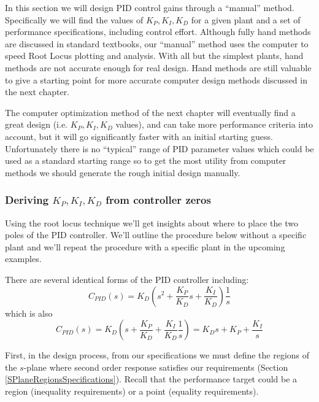 In this section we will design PID control gains through a ``manual'' method.  Specifically we will find the values of $K_P, K_I, K_D$ for a given plant and a set of performance specifications, including control effort.  Although fully hand methods are discussed in standard textbooks, our ``manual'' method uses the computer to speed Root Locus plotting and analysis.   With all but the simplest plants, hand methods are not accurate enough for real design.  Hand methods are still valuable to give a starting point for more accurate computer design methods discussed in the next chapter.

The computer optimization method of the next chapter will eventually find a great design (i.e. $K_P,K_I,K_D$ values), and can take more performance criteria into account, but it will go significantly faster with an initial starting guess.   Unfortunately there is no ``typical'' range of PID parameter values which could be used as a standard starting range so to get the most utility from computer methods we should generate the rough initial design manually.


\subsubsection{Deriving $K_P, K_I, K_D$ from controller zeros}\label{Kpderive}

Using the root locus technique we'll get insights about where to place
the two poles of the PID controller.  We'll outline the procedure below without a specific plant
and we'll repeat the procedure with a specific plant in the upcoming examples.

There are several identical  forms of the PID controller including:
\[
C_{PID}(s) = K_D \left ( s^2+ \frac{K_P}{K_D}s + \frac{K_I}{K_D} \right ) \frac{1}{s}
\]
which is also
\begin{equation}\label{eq:PIDform2}
C_{PID}(s) = K_D \left ( s + \frac{K_P}{K_D} + \frac{K_I}{K_D}\frac {1}  {s}  \right ) = K_Ds+K_P+\frac{K_I}{s}
\end{equation}

First, in the design process, from our specifications we must define the regions of the $s$-plane where second order
response satisfies our requirements (Section \ref{SPlaneRegionsSpecifications}).   Recall that
the performance target could be a region (inequality requirements) or a point (equality requirements).

